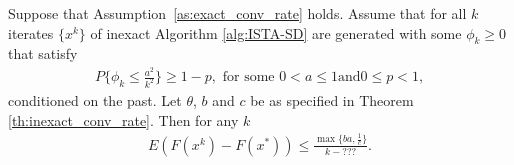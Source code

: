 \documentclass[11pt]{article}
\numberwithin{equation}{section}
\begin{document}
\begin{theorem}\label{th:inexact_random_conv_rate}
Suppose that Assumption~\ref{as:exact_conv_rate} holds. 
Assume that for all $k$ iterates $\{x^k\}$ of inexact Algorithm \ref{alg:ISTA-SD} are generated with some $\phi_k\geq 0$ that satisfy
\begin{align}
\label{equ:phi_conv_rate_required}
    P\{\phi_k \leq \frac{a^2}{k^2}\}\geq 1-p, \mbox{ for\ some\ } 0<a \leq 1 \mbox{and}  0\leq p<1,
\end{align}
conditioned on the past. 
Let  $\theta$, $b$ and $c$ be as specified in Theorem \ref{th:inexact_conv_rate}. Then for any $k$
\begin{align}
    \label{eq:bound_F_F*}
	E(F(x^k) - F(x^*) )
    \leq \frac{\max\{ba, \frac{1}{c}\}}{k-\mbox{???}}. 
\end{align}
\end{theorem}
\end{document}
